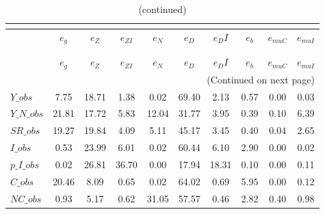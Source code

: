  
\begin{center}
\begin{longtable}{lccccccccc} 
\caption{VARIANCE DECOMPOSITION (in percent)}\\
 \label{Table:th_var_decomp_uncond}\\
\toprule 
$               $	 & 	 $        {e_g}$	 & 	 $        {e_Z}$	 & 	 $     {e_{ZI}}$	 & 	 $        {e_N}$	 & 	 $        {e_D}$	 & 	 $       {e_DI}$	 & 	 $        {e_b}$	 & 	 $    {e_{muC}}$	 & 	 $    {e_{muI}}$\\
\midrule \endfirsthead 
\caption{(continued)}\\
 \toprule \\ 
$               $	 & 	 $        {e_g}$	 & 	 $        {e_Z}$	 & 	 $     {e_{ZI}}$	 & 	 $        {e_N}$	 & 	 $        {e_D}$	 & 	 $       {e_DI}$	 & 	 $        {e_b}$	 & 	 $    {e_{muC}}$	 & 	 $    {e_{muI}}$\\
\midrule \endhead 
\midrule \multicolumn{10}{r}{(Continued on next page)} \\ \bottomrule \endfoot 
\bottomrule \endlastfoot 
$Y\_obs         $	 & 	         7.75	 & 	        18.71	 & 	         1.38	 & 	         0.02	 & 	        69.40	 & 	         2.13	 & 	         0.57	 & 	         0.00	 & 	         0.03 \\ 
$Y\_N\_obs      $	 & 	        21.81	 & 	        17.72	 & 	         5.83	 & 	        12.04	 & 	        31.77	 & 	         3.95	 & 	         0.39	 & 	         0.10	 & 	         6.39 \\ 
$SR\_obs        $	 & 	        19.27	 & 	        19.84	 & 	         4.09	 & 	         5.11	 & 	        45.17	 & 	         3.45	 & 	         0.40	 & 	         0.04	 & 	         2.65 \\ 
$I\_obs         $	 & 	         0.53	 & 	        23.99	 & 	         6.01	 & 	         0.02	 & 	        60.44	 & 	         6.10	 & 	         2.90	 & 	         0.00	 & 	         0.02 \\ 
$p\_I\_obs      $	 & 	         0.02	 & 	        26.81	 & 	        36.70	 & 	         0.00	 & 	        17.94	 & 	        18.31	 & 	         0.10	 & 	         0.00	 & 	         0.11 \\ 
$C\_obs         $	 & 	        20.46	 & 	         8.09	 & 	         0.65	 & 	         0.02	 & 	        64.02	 & 	         0.69	 & 	         5.95	 & 	         0.00	 & 	         0.12 \\ 
$NC\_obs        $	 & 	         0.93	 & 	         5.17	 & 	         0.62	 & 	        31.05	 & 	        57.57	 & 	         0.46	 & 	         2.82	 & 	         0.40	 & 	         0.98 \\ 

\end{longtable}
\end{center}
